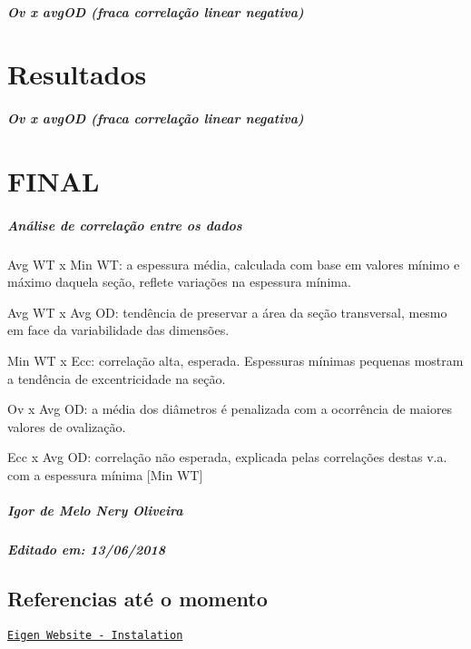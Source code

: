 \subparagraph*{Ov x avg\+OD (fraca correlação linear negativa)}

\subsection*{}





\section*{Resultados}

\subparagraph*{Ov x avg\+OD (fraca correlação linear negativa)}

\subsection*{}





\section*{F\+I\+N\+AL}

\subparagraph*{Análise de correlação entre os dados}


\begin{DoxyItemize}
\item Avg WT x Min WT\+: a espessura média, calculada com base em valores mínimo e máximo daquela seção, reflete variações na espessura mínima.
\item Avg WT x Avg OD\+: tendência de preservar a área da seção transversal, mesmo em face da variabilidade das dimensões.
\item Min WT x Ecc\+: correlação alta, esperada. Espessuras mínimas pequenas mostram a tendência de excentricidade na seção.
\item Ov x Avg OD\+: a média dos diâmetros é penalizada com a ocorrência de maiores valores de ovalização.
\item Ecc x Avg OD\+: correlação não esperada, explicada pelas correlações destas v.\+a. com a espessura mínima \mbox{[}Min WT\mbox{]}
\end{DoxyItemize}

\subparagraph*{Igor de Melo Nery Oliveira}

\subparagraph*{Editado em\+: 13/06/2018}

\subsection*{Referencias até o momento}

\href{http://eigen.tuxfamily.org/index.php?title=IDEs#Visual_Studio}{\tt Eigen Website -\/ Instalation} 